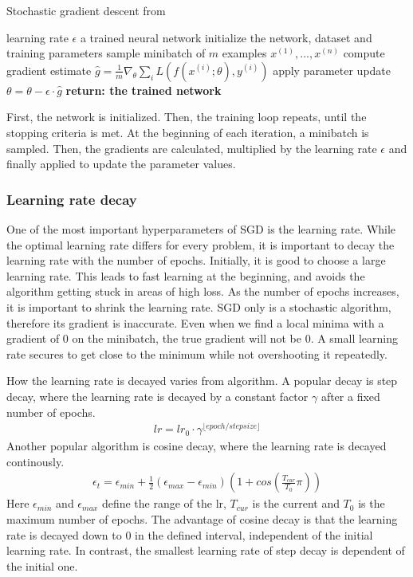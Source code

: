 \begin{algorithm}\label{alg:SGD}
    \begin{algorithmic}[1]
        \caption{Stochastic gradient descent from \cite{Goodfellow-et-al-2016}}
        \REQUIRE learning rate $\epsilon$
        \ENSURE a trained neural network
        \STATE initialize the network, dataset and training parameters
            \STATE sample minibatch of $m$ examples ${x^{(1)}, ... ,x^{(n)}}$
            \STATE compute gradient estimate $\hat{g}=\frac{1}{m} \nabla_\theta \sum_i L(f(x^{(i)};\theta),y^{(i)})$
            \STATE apply parameter update $\theta=\theta-\epsilon\cdot\hat{g}$
        \ENDWHILE
        \STATE \textbf{return: the trained network}
    \end{algorithmic}
\end{algorithm}

First, the network is initialized. Then, the training loop repeats, until the
stopping criteria is met. At the beginning of each iteration, a minibatch is sampled. Then, the
gradients are calculated, multiplied by the learning rate $\epsilon$ and finally
applied to update the parameter values.


\subsubsection{Learning rate decay}\label{sub:Learing_rate_decay}
One of the most important hyperparameters of SGD is the learning rate. While the
optimal learning rate differs for every problem, it is important to decay the
learning rate with the number of epochs. Initially, it is good to choose a
large learning rate. This leads to fast learning at the beginning, and avoids
the algorithm getting stuck in areas of high loss. As the number of epochs
increases, it is important to shrink the learning rate. SGD only is a stochastic
algorithm, therefore its gradient is inaccurate. Even when we find a local
minima with a gradient of 0 on the minibatch, the true gradient will not be 0. A
small learning rate secures to get close to the minimum while not overshooting it
repeatedly.

How the learning rate is decayed varies from algorithm. A popular decay is step
decay, where the learning rate is decayed by a constant factor $\gamma$ after a
fixed number of epochs.
\begin{align}
    lr = lr_0 \cdot \gamma^{\lfloor epoch/stepsize \rfloor}
\end{align}
Another popular algorithm is cosine decay, where the learning rate is decayed
continously.
\begin{align}\label{eq:cosine_decay}
    \epsilon_t = \epsilon_{min} + \frac{1}{2} (\epsilon_{max} - \epsilon_{min})(1+cos(\frac{T_{cur}}{T_0}\pi))
\end{align}
Here $\epsilon_{min}$ and $\epsilon_{max}$ define the range of the lr, $T_{cur}$
is the current and $T_0$ is the maximum number of epochs. The advantage of
cosine decay is that the learning rate is decayed down to 0 in the defined
interval, independent of the initial learning rate. In contrast, the smallest
learning rate of step decay is dependent of the initial one.

